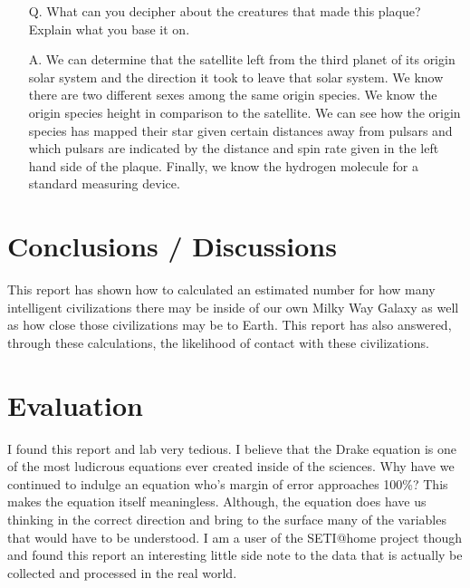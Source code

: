\documentclass{article}
\begin{document}
\begin{enumerate}
\item[Q.] What can you decipher about the creatures that made this plaque? Explain what you base it on.
\item[A.] We can determine that the satellite left from the third planet of its origin solar system and the direction it took
to leave that solar system. We know there are two different sexes among the same origin species. We know the origin
species height in comparison to the satellite. We can see how the origin species has mapped their star given certain
distances away from pulsars and which pulsars are indicated by the distance and spin rate given in the left hand side
of the plaque. Finally, we know the hydrogen molecule for a standard measuring device.
\end{enumerate}


\section{Conclusions / Discussions}

This report has shown how to calculated an estimated number for how many intelligent civilizations there
may be inside of our own Milky Way Galaxy as well as how close those civilizations may be to Earth. This report
has also answered, through these calculations, the likelihood of contact with these civilizations.


\section{Evaluation}

I found this report and lab very tedious. I believe that the Drake equation is one of the most ludicrous
equations ever created inside of the sciences. Why have we continued to indulge an equation who's margin
of error approaches 100\%? This makes the equation itself meaningless. Although, the equation does
have us thinking in the correct direction and bring to the surface many of the variables that would
have to be understood. I am a user of the SETI@home project though and found this report an
interesting little side note to the data that is actually be collected and processed in the real world.
\end{document}
